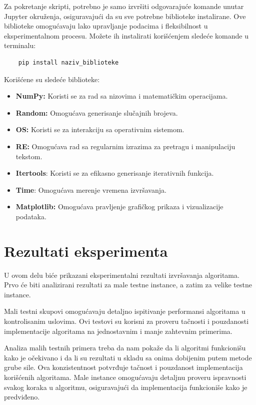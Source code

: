 \documentclass[12pt,oneside]{memoir}
\begin{document}
Za pokretanje skripti, potrebno je samo izvršiti odgovarajuće komande unutar Jupyter okruženja, osiguravajući da su sve potrebne biblioteke instalirane. Ove biblioteke omogućavaju lako upravljanje podacima i fleksibilnost u eksperimentalnom procesu. Možete ih instalirati korišćenjem sledeće komande u terminalu:
\begin{verbatim}
    pip install naziv_biblioteke
\end{verbatim}
Korišćene su sledeće biblioteke: 
\begin{itemize}
    \item \textbf{NumPy:} Koristi se za rad sa nizovima i matematičkim operacijama.
    \item \textbf{Random:} Omogućava generisanje slučajnih brojeva.
    \item \textbf{OS:} Koristi se za interakciju sa operativnim sistemom.
    \item \textbf{RE:} Omogućava rad sa regularnim izrazima za pretragu i manipulaciju tekstom.
    \item \textbf{Itertools}: Koristi se za efikasno generisanje iterativnih funkcija.
    \item \textbf{Time}: Omogućava merenje vremena izvršavanja.
    \item \textbf{Matplotlib:} Omogućava pravljenje grafičkog prikaza i vizualizacije podataka.
\end{itemize}

\section{Rezultati eksperimenta}
U ovom delu biće prikazani eksperimentalni rezultati izvršavanja algoritama. Prvo će biti analizirani rezultati za male testne instance, a zatim za velike testne instance.

Mali testni skupovi omogućavaju detaljno ispitivanje performansi algoritama u kontrolisanim uslovima. Ovi testovi su korisni za proveru tačnosti i pouzdanosti implementacije algoritama na jednostavnim i manje zahtevnim primerima. 

Analiza malih testnih primera treba da nam pokaže da li algoritmi funkcionišu kako je očekivano i da li su rezultati u skladu sa onima dobijenim putem metode grube sile. Ova konzistentnost potvrđuje tačnost i pouzdanost implementacija korišćenih algoritama. Male instance omogućavaju detaljnu proveru ispravnosti svakog koraka u algoritmu, osiguravajući da implementacija funkcioniše kako je predviđeno.
\end{document}
